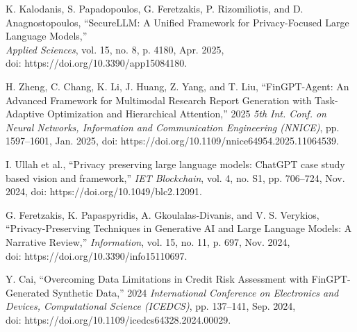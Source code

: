 \documentclass[12pt,a4paper]{report}
\begin{document}
\begin{enumerate}[label={[\arabic*]}]
    \vspace{0.3cm}

    \item K. Kalodanis, S. Papadopoulos, G. Feretzakis, P. Rizomiliotis, and D. Anagnostopoulos, “SecureLLM: A Unified Framework for Privacy-Focused Large Language Models,”\\ \textit{Applied Sciences}, vol. 15, no. 8, p. 4180, Apr. 2025,\\ doi: https://doi.org/10.3390/app15084180.

    \vspace{0.3cm}

    \item H. Zheng, C. Chang, K. Li, J. Huang, Z. Yang, and T. Liu, “FinGPT-Agent: An Advanced Framework for Multimodal Research Report Generation with Task-Adaptive Optimization and Hierarchical Attention,” 2025 \textit{5th Int. Conf. on Neural Networks, Information and Communication Engineering (NNICE)}, pp. 1597–1601, Jan. 2025, doi: https://doi.org/10.1109/nnice64954.2025.11064539.

    \vspace{0.3cm}

    \item I. Ullah et al., “Privacy preserving large language models: ChatGPT case study based vision and framework,” \textit{IET Blockchain}, vol. 4, no. S1, pp. 706–724, Nov. 2024, doi: https://doi.org/10.1049/blc2.12091.

    \vspace{0.3cm}

    \item G. Feretzakis, K. Papaspyridis, A. Gkoulalas-Divanis, and V. S. Verykios, “Privacy-Preserving Techniques in Generative AI and Large Language Models: A Narrative Review,” \textit{Information}, vol. 15, no. 11, p. 697, Nov. 2024,\\ doi: https://doi.org/10.3390/info15110697.

    \vspace{0.3cm}

    \item Y. Cai, “Overcoming Data Limitations in Credit Risk Assessment with FinGPT-Generated Synthetic Data,” 2024 \textit{International Conference on Electronics and Devices, Computational Science (ICEDCS)}, pp. 137–141, Sep. 2024,\\ doi: https://doi.org/10.1109/icedcs64328.2024.00029.

    \vspace{0.3cm}


\end{enumerate}
\end{document}
